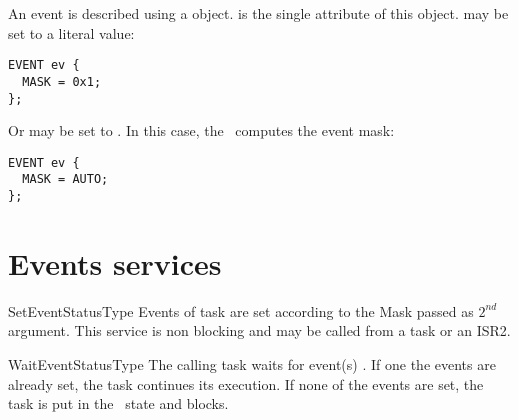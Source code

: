 An event is described using a  object.  is the single attribute of this object.  may be set to a literal value:

\begin{lstlisting}[language=OIL]
EVENT ev {
  MASK = 0x1;
};
\end{lstlisting}


Or  may be set to . In this case, the \sysgen\ computes the event mask:

\begin{lstlisting}[language=OIL]
EVENT ev {
  MASK = AUTO;
};
\end{lstlisting}


\section{Events services}

\begin{service}{SetEvent}{StatusType}
Events of task  are set according to the Mask passed as $2^{nd}$ argument. This service is non blocking and may be called from a task or an ISR2.


\end{service}


\begin{service}{WaitEvent}{StatusType}
The calling task waits for event(s) . If one the events are already set, the task continues its execution. If none of the events are set, the task is put in the \WAITING\ state and blocks.



\end{service}

